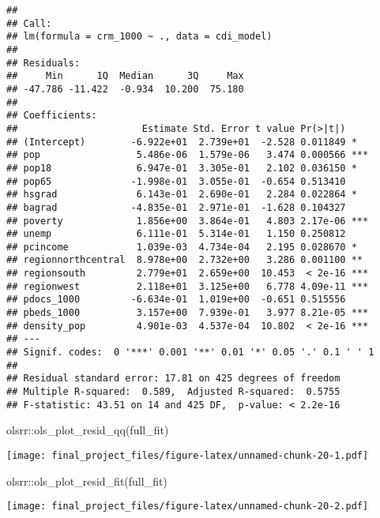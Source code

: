\documentclass[
]{article}
\newenvironment{Shaded}{\begin{snugshade}}{\end{snugshade}}
\newcommand{\FunctionTok}[1]{\textcolor[rgb]{0.00,0.00,0.00}{#1}}
\newcommand{\NormalTok}[1]{#1}
\newcommand{\SpecialCharTok}[1]{\textcolor[rgb]{0.00,0.00,0.00}{#1}}
\begin{document}
\begin{verbatim}
## 
## Call:
## lm(formula = crm_1000 ~ ., data = cdi_model)
## 
## Residuals:
##     Min      1Q  Median      3Q     Max 
## -47.786 -11.422  -0.934  10.200  75.180 
## 
## Coefficients:
##                      Estimate Std. Error t value Pr(>|t|)    
## (Intercept)        -6.922e+01  2.739e+01  -2.528 0.011849 *  
## pop                 5.486e-06  1.579e-06   3.474 0.000566 ***
## pop18               6.947e-01  3.305e-01   2.102 0.036150 *  
## pop65              -1.998e-01  3.055e-01  -0.654 0.513410    
## hsgrad              6.143e-01  2.690e-01   2.284 0.022864 *  
## bagrad             -4.835e-01  2.971e-01  -1.628 0.104327    
## poverty             1.856e+00  3.864e-01   4.803 2.17e-06 ***
## unemp               6.111e-01  5.314e-01   1.150 0.250812    
## pcincome            1.039e-03  4.734e-04   2.195 0.028670 *  
## regionnorthcentral  8.978e+00  2.732e+00   3.286 0.001100 ** 
## regionsouth         2.779e+01  2.659e+00  10.453  < 2e-16 ***
## regionwest          2.118e+01  3.125e+00   6.778 4.09e-11 ***
## pdocs_1000         -6.634e-01  1.019e+00  -0.651 0.515556    
## pbeds_1000          3.157e+00  7.939e-01   3.977 8.21e-05 ***
## density_pop         4.901e-03  4.537e-04  10.802  < 2e-16 ***
## ---
## Signif. codes:  0 '***' 0.001 '**' 0.01 '*' 0.05 '.' 0.1 ' ' 1
## 
## Residual standard error: 17.81 on 425 degrees of freedom
## Multiple R-squared:  0.589,  Adjusted R-squared:  0.5755 
## F-statistic: 43.51 on 14 and 425 DF,  p-value: < 2.2e-16
\end{verbatim}

\begin{Shaded}
\begin{Highlighting}[]
\NormalTok{olsrr}\SpecialCharTok{::}\FunctionTok{ols\_plot\_resid\_qq}\NormalTok{(full\_fit)}
\end{Highlighting}
\end{Shaded}

\texttt{[image: final\_project\_files/figure-latex/unnamed-chunk-20-1.pdf]}

\begin{Shaded}
\begin{Highlighting}[]
\NormalTok{olsrr}\SpecialCharTok{::}\FunctionTok{ols\_plot\_resid\_fit}\NormalTok{(full\_fit)}
\end{Highlighting}
\end{Shaded}

\texttt{[image: final\_project\_files/figure-latex/unnamed-chunk-20-2.pdf]}
\end{document}
